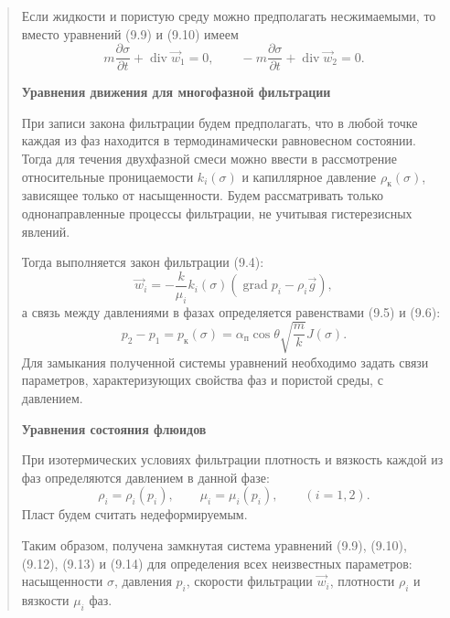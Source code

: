 \documentclass[12pt,a4paper]{article}
\DeclareMathOperator{\grad}{grad}
\DeclareMathOperator{\Div}{div}
\newcommand{\topic}[1]{\par\medskip\noindent\textbf{#1}\par\nobreak\smallskip}
\begin{document}
\begin{quote}\sloppy
Если жидкости и пористую среду можно предполагать несжимаемыми, то вместо уравнений (9.9) и (9.10) имеем
\begin{equation}m\frac{\partial\sigma}{\partial t}+\Div\vec w_1=0,\qquad-m\frac{\partial\sigma}{\partial t}+\Div\vec w_2=0.\tag{9.11}\label{q10:eq-9-11}\end{equation}
\topic{Уравнения движения для многофазной фильтрации}
При записи закона фильтрации будем предполагать, что в любой точке каждая из фаз находится в термодинамически равновесном состоянии. Тогда для течения двухфазной смеси можно ввести в рассмотрение относительные проницаемости $k_i(\sigma)$ и капиллярное давление $\rho_\text{к}(\sigma)$, зависящее только от насыщенности.
Будем рассматривать только однонаправленные процессы фильтрации, не учитывая гистерезисных явлений.

Тогда выполняется закон фильтрации (9.4):
\begin{equation}\vec w_i=-\frac{k}{\mu_i}k_i(\sigma)(\grad p_i-\rho_i\vec g),\tag{9.12}\label{q10:eq-9-12}\end{equation}
а связь между давлениями в фазах определяется равенствами (9.5) и (9.6):
\begin{equation}p_2-p_1=p_\text{к}(\sigma)=\alpha_\text{п}\cos\theta\sqrt{\frac{m}{k}}J(\sigma).\tag{9.13}\label{q10:eq-9-13}\end{equation}
Для замыкания полученной системы уравнений необходимо задать связи параметров, характеризующих свойства фаз и пористой среды, с давлением.

\topic{Уравнения состояния флюидов}
При изотермических условиях фильтрации плотность и вязкость каждой из фаз определяются давлением в данной фазе:
\begin{equation}\rho_i=\rho_i(p_i),\qquad\mu_i=\mu_i(p_i),\qquad(i=1,2).\tag{9.14}\label{q10:eq-9-14}\end{equation}
Пласт будем считать недеформируемым.

Таким образом, получена замкнутая система уравнений (9.9), (9.10), (9.12), (9.13) и (9.14) для определения всех неизвестных параметров: насыщенности $\sigma$, давления $p_i$, скорости фильтрации $\vec w_i$, плотности $\rho_i$ и вязкости $\mu_i$ фаз.
\par\nobreak{}\par
\end{quote}
\endgroup
\end{document}
